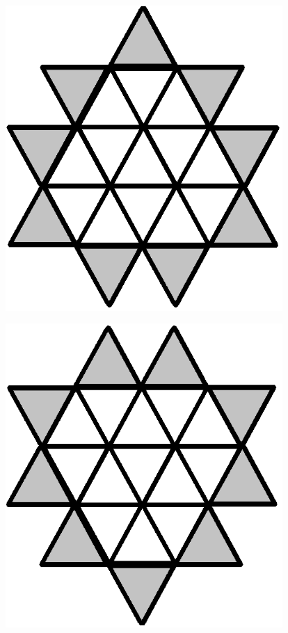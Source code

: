 \documentclass{article}
\newenvironment{Figure}
  {\par\medskip\noindent\minipage{\linewidth}}
  {\endminipage\par\medskip}
\begin{document}
\begin{multicols}{2}
\begin{Figure}
 \includegraphics[width=0.79\textwidth]{imgs/extendedtriangle1.png}
\label{fig:exttriangle1std}
\end{Figure}
\begin{Figure}
 \centering
 \includegraphics[width=0.79\textwidth]{imgs/extendedtriangle2.png}
\label{fig:exttriangle2std}
\end{Figure}


\end{multicols}
\end{document}
